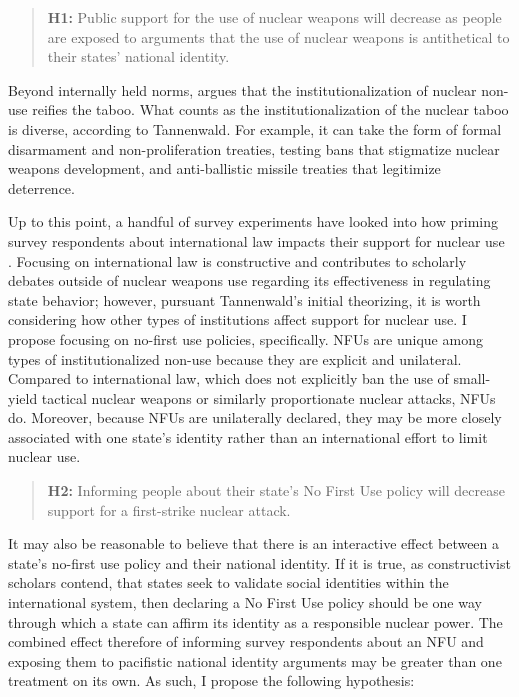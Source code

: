 \documentclass[12pt]{article}
\begin{document}
\begin{quote}
\textbf{H1:} Public support for the use of nuclear weapons will decrease as people are exposed to arguments that the use of nuclear weapons is antithetical to their states' national identity.
\end{quote}

Beyond internally held norms, \citet{tannewald_nuclear_2007} argues that the institutionalization of nuclear non-use reifies the taboo. What counts as the institutionalization of the nuclear taboo is diverse, according to Tannenwald. For example, it can take the form of formal disarmament and non-proliferation treaties, testing bans that stigmatize nuclear weapons development, and anti-ballistic missile treaties that legitimize deterrence. 

Up to this point, a handful of survey experiments have looked into how priming survey respondents about international law impacts their support for nuclear use \citep{carpenter_stopping_2020, sagan_does_2020, sagan_atomic_2024}.  Focusing on international law is constructive and contributes to scholarly debates outside of nuclear weapons use regarding its effectiveness in regulating state behavior; however, pursuant Tannenwald's initial theorizing, it is worth considering how other types of institutions affect support for nuclear use. I propose focusing on no-first use policies, specifically. NFUs are unique among types of institutionalized non-use because they are explicit and unilateral. Compared to international law, which does not explicitly ban the use of small-yield tactical nuclear weapons or similarly proportionate nuclear attacks, NFUs do. Moreover, because NFUs are unilaterally declared, they may be more closely associated with one state's identity rather than an international effort to limit nuclear use.

\begin{quote}
\textbf{H2:} Informing people about their state's No First Use policy will decrease support for a first-strike nuclear attack.
\end{quote}

It may also be reasonable to believe that there is an interactive effect between a state's no-first use policy and their national identity. If it is true, as constructivist scholars contend, that states seek to validate social identities within the international system, then declaring a No First Use policy should be one way through which a state can affirm its identity as a responsible nuclear power. The combined effect therefore of informing survey respondents about an NFU and exposing them to pacifistic national identity arguments may be greater than one treatment on its own. As such, I propose the following hypothesis:
\end{document}

